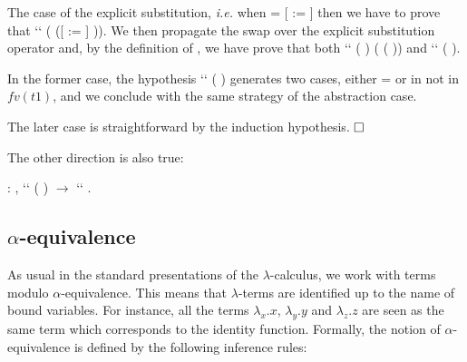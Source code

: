 The case of the explicit substitution, {\it i.e.} when  = [ := ] then we have to prove that     ``  (   ([ := ] )). We then propagate the swap over the explicit substitution operator and, by the definition of , we have prove that both     ``  (   ) ( (   )) and     ``  (   ).
\begin{coqdoccode}
\end{coqdoccode}
In the former case, the hypothesis  ``   ( ) generates two cases, either  =  or  in not in $fv(t1)$, and we conclude with the same strategy of the abstraction case.
\begin{coqdoccode}
\end{coqdoccode}
The later case is straightforward by the induction hypothesis. $\hfill\Box$
\begin{coqdoccode}
\coqdocemptyline
\end{coqdoccode}
The other direction is also true:
\begin{coqdoccode}
\coqdocemptyline
\coqdocnoindent
{} : \coqdockw{\ensuremath{\forall}}    ,     ``  (   ) \ensuremath{\rightarrow}  ``  .\coqdoceol
\coqdocemptyline
\coqdocemptyline
\end{coqdoccode}
\subsection{$\alpha$-equivalence}



 As usual in the standard presentations of the $\lambda$-calculus, we work with terms modulo $\alpha$-equivalence. This means that $\lambda$-terms are identified up to the name of bound variables. For instance, all the terms $\lambda_x.x$, $\lambda_y.y$ and $\lambda_z.z$ are seen as the same term which corresponds to the identity function. Formally, the notion of $\alpha$-equivalence is defined by the following inference rules:


